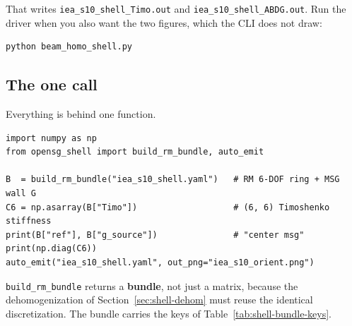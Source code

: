 \noindent
That writes \texttt{iea\_s10\_shell\_Timo.out} and
\texttt{iea\_s10\_shell\_ABDG.out}. Run the driver when you also want the two
figures, which the CLI does not draw:

\begin{lstlisting}[style=shellst]
python beam_homo_shell.py
\end{lstlisting}

\subsection{The one call}

Everything is behind one function.

\begin{lstlisting}[style=opensg,caption={The minimal script: build the bundle, take the 6x6, emit the orientation figure.}]
import numpy as np
from opensg_shell import build_rm_bundle, auto_emit

B  = build_rm_bundle("iea_s10_shell.yaml")   # RM 6-DOF ring + MSG wall G
C6 = np.asarray(B["Timo"])                   # (6, 6) Timoshenko stiffness
print(B["ref"], B["g_source"])               # "center msg"
print(np.diag(C6))
auto_emit("iea_s10_shell.yaml", out_png="iea_s10_orient.png")
\end{lstlisting}

\texttt{build\_rm\_bundle} returns a \textbf{bundle}, not just a matrix, because
the dehomogenization of Section~\ref{sec:shell-dehom} must reuse the identical
discretization. The bundle carries the keys of
Table~\ref{tab:shell-bundle-keys}.

